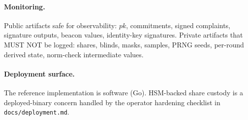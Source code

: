 \paragraph{Monitoring.}
Public artifacts safe for observability: $\mathit{pk}$, commitments,
signed complaints, signature outputs, beacon values, identity-key
signatures. Private artifacts that MUST NOT be logged: shares,
blinds, masks, samples, PRNG seeds, per-round derived state,
norm-check intermediate values.

\paragraph{Deployment surface.}
The reference implementation is software (Go). HSM-backed share
custody is a deployed-binary concern handled by the operator
hardening checklist in \texttt{docs/deployment.md}.
